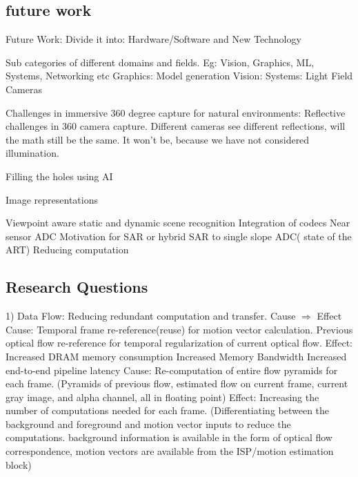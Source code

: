 \subsection{future work}


Future Work:
Divide it into:
Hardware/Software and New Technology

Sub categories of different domains and fields. 
Eg: Vision, Graphics, ML, Systems, Networking etc
Graphics: Model generation 
Vision: 
Systems: Light Field Cameras

Challenges in immersive 360 degree capture for natural environments:
Reflective challenges in 360 camera capture. Different cameras see different reflections, will the math still be the same. It won't be, because we have not considered illumination. 

Filling the holes using AI

Image representations

Viewpoint aware static and dynamic scene recognition
Integration of codecs 
Near sensor ADC
Motivation for SAR or hybrid SAR to single slope ADC( state of the ART)
Reducing computation 

\subsection{Research Questions}


1)  Data Flow: Reducing redundant computation and transfer.\newline
Cause $\Rightarrow$ Effect  \newline
Cause:\newline
Temporal frame re-reference(reuse) for motion vector calculation.\newline
Previous optical flow re-reference for temporal regularization of current optical flow.\newline
Effect: \newline
Increased DRAM memory consumption \newline
Increased Memory Bandwidth \newline
Increased end-to-end pipeline latency \newline
Cause: \newline
Re-computation of entire flow pyramids for each frame. (Pyramids of previous flow, estimated flow on current frame, current gray image, and alpha channel, all in floating point)\newline
Effect:\newline
Increasing the number of computations needed for each frame. \newline
(Differentiating between the background and foreground and motion vector inputs to reduce the computations. background information is available in the form of optical flow correspondence, motion vectors are available from the ISP/motion estimation block)\newline

